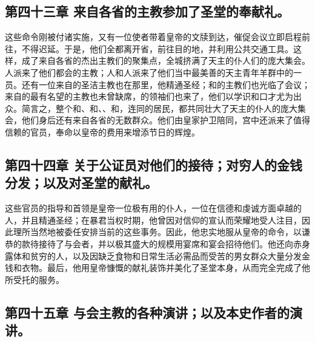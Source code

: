 
\subsection{第四十三章 来自各省的主教参加了圣堂的奉献礼。}

这些命令刚被付诸实施，又有一位使者带着皇帝的文牍到达，催促会议立即启程前往，不得迟延。于是，他们全都离开省，前往目的地，并利用公共交通工具。这样，成了来自各省的杰出主教们的聚集点，全城挤满了天主的仆人们的庞大集会。人派来了他们都会的主教；人和人派来了他们当中最美善的天主青年羊群中的一员。还有一位来自的圣洁主教也在那里，他精通圣经；和的主教们也光临了会议；来自的最有名望的主教也未曾缺席，的领袖们也来了，他们以学识和口才尤为出众。简言之，整个和、和、、和，连同的居民，都共同壮大了天主的仆人的庞大集会，他们身后还有来自各省的无数群众。他们由皇家护卫陪同，宫中还派来了值得信赖的官员，奉命以皇帝的费用来增添节日的辉煌。\par


\subsection{第四十四章 关于公证员对他们的接待；对穷人的金钱分发；以及对圣堂的献礼。}

这些官员的指导和首领是皇帝一位极有用的仆人，一位在信德和虔诚方面卓越的人，并且精通圣经；在暴君当权时期，他曾因对信仰的宣认而荣耀地受人注目，因此理所当然地被委任安排当前的这些事务。因此，他忠实地服从皇帝的命令，以谦恭的款待接待了与会者，并以极其盛大的规模用宴席和宴会招待他们。他还向赤身露体和贫穷的人，以及因缺乏食物和日常生活必需品而受苦的男女群众大量分发金钱和衣物。最后，他用皇帝慷慨的献礼装饰并美化了圣堂本身，从而完全完成了他所受托的服务。\par


\subsection{第四十五章 与会主教的各种演讲；以及本史作者的演讲。}

